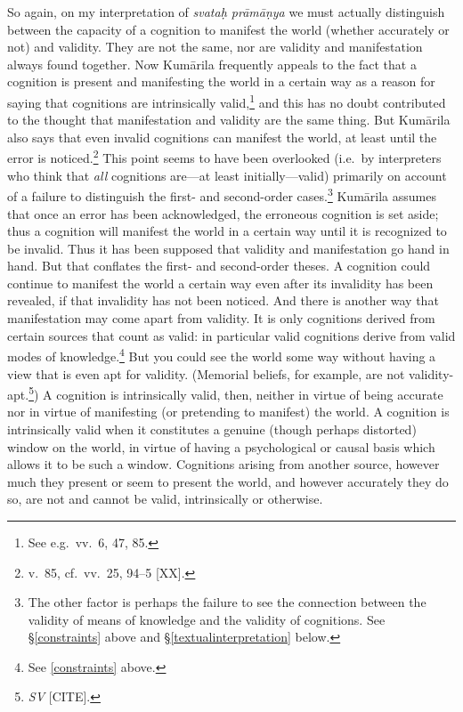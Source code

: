 ﻿\documentclass[11pt]{amsart}
\begin{document}

So again, on my interpretation of \emph{svata\d h pr\=am\=a\d nya} we must actually distinguish between the capacity of a cognition to manifest the world (whether accurately or not) and validity. They are not the same, nor are validity and manifestation always found together. Now Kum\=arila frequently appeals to the fact that a cognition is present and manifesting the world in a certain way as a reason for saying that cognitions are intrinsically valid,\footnote{See e.g.~vv.~6, 47, 85.} and this has no doubt contributed to the thought that manifestation and validity are the same thing. But Kum\=arila also says that even invalid cognitions can manifest the world, at least until the error is noticed.\footnote{v.~85, cf.~vv.~25, 94--5 [XX].} This point seems to have been overlooked (i.e.~by interpreters who think that \emph{all} cognitions are---at least initially---valid) primarily on account of a failure to distinguish the first- and second-order cases.\footnote{The other factor is perhaps the failure to see the connection between the validity of means of knowledge and the validity of cognitions. See \S\ref{constraints} above and \S\ref{textualinterpretation} below.} Kum\=arila assumes that once an error has been acknowledged, the erroneous cognition is set aside; thus a cognition will manifest the world in a certain way until it is recognized to be invalid. Thus it has been supposed that validity and manifestation go hand in hand. But that conflates the first- and second-order theses. A cognition could continue to manifest the world a certain way even after its invalidity has been revealed, if that invalidity has not been noticed. And there is another way that manifestation may come apart from validity. It is only cognitions derived from certain sources that count as valid: in particular valid cognitions derive from valid modes of knowledge.\footnote{See \ref{constraints} above.} But you could see the world some way without having a view that is even apt for validity. (Memorial beliefs, for example, are not validity-apt.\footnote{\emph{SV} [CITE].}) A cognition is intrinsically valid, then, neither in virtue of being accurate nor in virtue of manifesting (or pretending to manifest) the world. A cognition is intrinsically valid when it constitutes a genuine (though perhaps distorted) window on the world, in virtue of having a psychological or causal basis which allows it to be such a window. Cognitions arising from another source, however much they present or seem to present the world, and however accurately they do so, are not and cannot be valid, intrinsically or otherwise.
\end{document}
